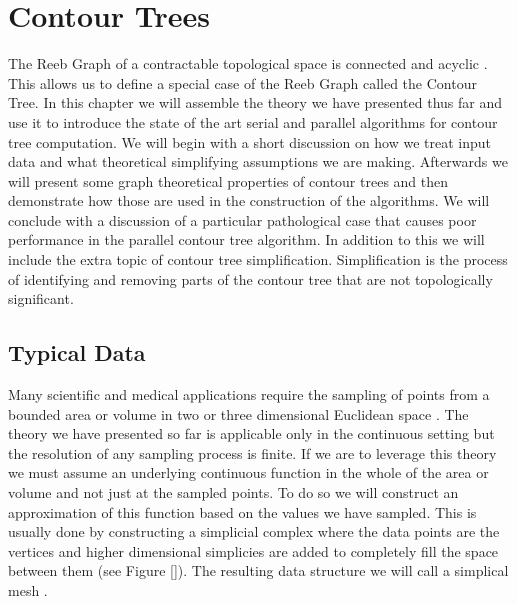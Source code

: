 \chapter{Contour Trees}
\label{chapter3}


The Reeb Graph of a contractable topological space is connected and acyclic \cite{comp-topo}. This allows us to define a special case of the Reeb Graph called the Contour Tree.  In this chapter we will assemble the theory we have presented thus far and use it to introduce the state of the art serial and parallel algorithms for contour tree computation. We will begin with a short discussion on how we treat input data and what theoretical simplifying assumptions we are making. Afterwards we will present some graph theoretical properties of contour trees and then demonstrate how those are used in the construction of the algorithms. We will conclude with a discussion of a particular pathological case that causes poor performance in the parallel contour tree algorithm. In addition to this we will include the extra topic of contour tree simplification. Simplification is the process of identifying and removing parts of the contour tree that are not topologically significant.


\section{Typical Data}




Many scientific and medical applications require the sampling of points from a bounded area or volume in two or three dimensional Euclidean space \cite{carr-masters}. The theory we have presented so far is applicable only in the continuous setting but the resolution of any sampling process is finite. If we are to leverage this theory we must assume an underlying continuous function in the whole of the area or volume and not just at the sampled points. To do so we will construct an approximation of this function based on the values we have sampled. This is usually done by constructing a simplicial complex where the data points are the vertices and higher dimensional simplicies are added to completely fill the space between them (see Figure []). The resulting data structure we will call a simplical mesh \cite{carr-masters}.

